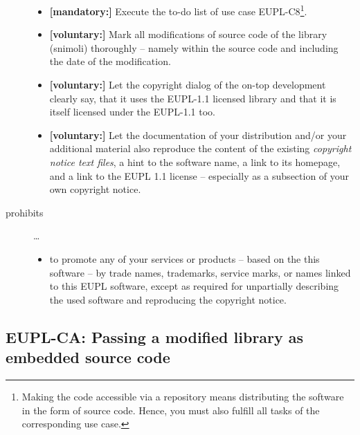 \begin{description}
\begin{itemize}
  \item \textbf{[mandatory:]} Execute the to-do list of use case EUPL-C8\footnote{
  Making the code accessible via a repository means distributing the software in
  the form of source code. Hence, you must also fulfill all tasks of the
  corresponding use case.}.
    
  \item \textbf{[voluntary:]} Mark all modifications of source code of the
  library (snimoli) thoroughly -- namely within the source code and including
  the date of the modification.
  
  \item \textbf{[voluntary:]} Let the copyright dialog of the on-top development
  clearly say, that it uses the EUPL-1.1 licensed library and that it is itself
  licensed under the EUPL-1.1 too.
  
  \item \textbf{[voluntary:]} Let the documentation of your distribution and/or
  your additional material  also reproduce the content of the existing
  \emph{copyright notice text files}, a hint to the software name, a link to its
  homepage, and a link to the EUPL 1.1 license -- especially as a subsection of
  your own copyright notice.
  
\end{itemize}

\item[prohibits] \ldots
\begin{itemize}
  \item to promote any of your services or products -- based on the this software
  -- by trade names, trademarks, service marks, or names linked to this EUPL
  software, except as required for unpartially describing the used software and
  reproducing the copyright notice.
\end{itemize}

\end{description}

\subsection{EUPL-CA: Passing a modified library as embedded source code}
\label{OSUC-10S-EUPL}

